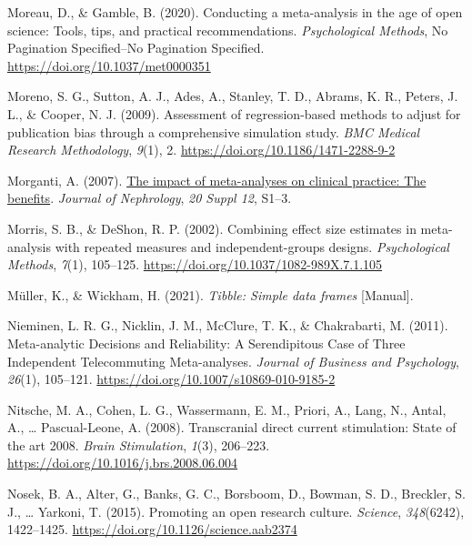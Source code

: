 \documentclass[
  man,floatsintext]{apa6}
\newlength{\cslhangindent}
\newlength{\cslentryspacingunit} %
\newenvironment{CSLReferences}[2] %
 {%
  \setlength{\parindent}{0pt}
  \ifodd #1
  \let\oldpar\par
  \def\par{\hangindent=\cslhangindent\oldpar}
  \fi
  \setlength{\parskip}{#2\cslentryspacingunit}
 }%
 {}
\begin{document}
\begin{CSLReferences}{1}{0}
\leavevmode{}%
Moreau, D., \& Gamble, B. (2020). Conducting a meta-analysis in the age of open science: {Tools}, tips, and practical recommendations. \emph{Psychological Methods}, No Pagination Specified--No Pagination Specified. \url{https://doi.org/10.1037/met0000351}

\leavevmode{}%
Moreno, S. G., Sutton, A. J., Ades, A., Stanley, T. D., Abrams, K. R., Peters, J. L., \& Cooper, N. J. (2009). Assessment of regression-based methods to adjust for publication bias through a comprehensive simulation study. \emph{BMC Medical Research Methodology}, \emph{9}(1), 2. \url{https://doi.org/10.1186/1471-2288-9-2}

\leavevmode{}%
Morganti, A. (2007). \href{https://www.ncbi.nlm.nih.gov/pubmed/18050136}{The impact of meta-analyses on clinical practice: The benefits}. \emph{Journal of Nephrology}, \emph{20 Suppl 12}, S1--3.

\leavevmode{}%
Morris, S. B., \& DeShon, R. P. (2002). Combining effect size estimates in meta-analysis with repeated measures and independent-groups designs. \emph{Psychological Methods}, \emph{7}(1), 105--125. \url{https://doi.org/10.1037/1082-989X.7.1.105}

\leavevmode{}%
Müller, K., \& Wickham, H. (2021). \emph{Tibble: {Simple} data frames} {[}Manual{]}.

\leavevmode{}%
Nieminen, L. R. G., Nicklin, J. M., McClure, T. K., \& Chakrabarti, M. (2011). Meta-analytic {Decisions} and {Reliability}: {A Serendipitous Case} of {Three Independent Telecommuting Meta-analyses}. \emph{Journal of Business and Psychology}, \emph{26}(1), 105--121. \url{https://doi.org/10.1007/s10869-010-9185-2}

\leavevmode{}%
Nitsche, M. A., Cohen, L. G., Wassermann, E. M., Priori, A., Lang, N., Antal, A., \ldots{} Pascual-Leone, A. (2008). Transcranial direct current stimulation: {State} of the art 2008. \emph{Brain Stimulation}, \emph{1}(3), 206--223. \url{https://doi.org/10.1016/j.brs.2008.06.004}

\leavevmode{}%
Nosek, B. A., Alter, G., Banks, G. C., Borsboom, D., Bowman, S. D., Breckler, S. J., \ldots{} Yarkoni, T. (2015). Promoting an open research culture. \emph{Science}, \emph{348}(6242), 1422--1425. \url{https://doi.org/10.1126/science.aab2374}


\end{CSLReferences}
\end{document}
